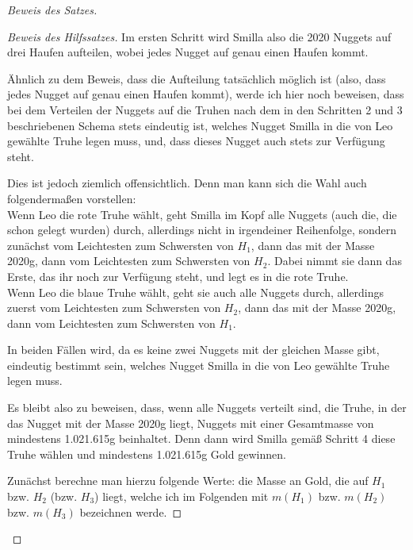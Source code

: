 \begin{proof}[Beweis des Satzes]
\begin{proof}[Beweis des Hilfssatzes]
        Im ersten Schritt wird Smilla also die 2020 Nuggets auf drei Haufen aufteilen, wobei jedes Nugget auf genau 
        einen Haufen kommt.
        
        Ähnlich zu dem Beweis, dass die Aufteilung tatsächlich möglich ist (also, dass jedes Nugget auf genau 
        einen Haufen kommt), werde ich hier noch beweisen, dass bei dem Verteilen der Nuggets auf die 
        Truhen nach dem in den Schritten 2 und 3 beschriebenen Schema stets eindeutig ist, welches Nugget Smilla in 
        die von Leo gewählte Truhe legen muss, und, dass dieses Nugget auch stets zur Verfügung steht.

        Dies ist jedoch ziemlich offensichtlich. Denn man kann sich die Wahl auch folgendermaßen vorstellen:\\
        Wenn Leo die rote Truhe wählt, geht Smilla im Kopf alle Nuggets (auch die, die schon gelegt wurden) durch, 
        allerdings nicht in irgendeiner Reihenfolge, sondern zunächst vom Leichtesten zum Schwersten von $H_1$, 
        dann das mit der Masse 2020g, dann vom Leichtesten zum Schwersten von $H_2$. Dabei nimmt sie dann das Erste, 
        das ihr noch zur Verfügung steht, und legt es in die rote Truhe. \\
        Wenn Leo die blaue Truhe wählt, geht sie auch alle Nuggets durch, allerdings zuerst vom Leichtesten zum 
        Schwersten von $H_2$, dann das mit der Masse 2020g, dann vom Leichtesten zum Schwersten von $H_1$.

        In beiden Fällen wird, da es keine zwei Nuggets mit der gleichen Masse gibt, eindeutig bestimmt sein, welches 
        Nugget Smilla in die von Leo gewählte Truhe legen muss.

        Es bleibt also zu beweisen, dass, wenn alle Nuggets verteilt sind, die Truhe, in der das Nugget mit der Masse 
        2020g liegt, Nuggets mit einer Gesamtmasse von mindestens 1.021.615g beinhaltet. Denn dann wird Smilla gemäß 
        Schritt 4 diese Truhe wählen und mindestens 1.021.615g Gold gewinnen.

        Zunächst berechne man hierzu folgende Werte: die Masse an Gold, die auf $H_1$ bzw. $H_2$ (bzw. $H_3$) liegt, 
        welche ich im Folgenden mit $m(H_1)$ bzw. $m(H_2)$ bzw. $m(H_3)$ bezeichnen werde.


\end{proof}
\end{proof}
